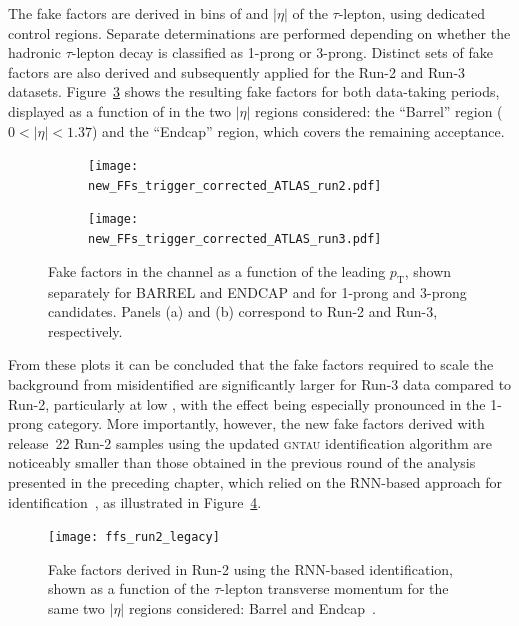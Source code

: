 The fake factors are derived in bins of \pt and $|\eta|$ of the $\tau$-lepton, using dedicated \taulephad control regions. Separate determinations are performed depending on whether the hadronic $\tau$-lepton decay is classified as 1-prong or 3-prong. Distinct sets of fake factors are also derived and subsequently applied for the Run-2 and Run-3 datasets. Figure~\ref{fig:ff_run2_run3} shows the resulting fake factors for both data-taking periods, displayed as a function of \pt in the two $|\eta|$ regions considered: the ``Barrel'' region ($0<|\eta|<1.37$) and the ``Endcap'' region, which covers the remaining acceptance.
\begin{figure}[htbp]
    \centering
    \begin{subfigure}[b]{0.49\textwidth}
      \centering
      \texttt{[image: new\_FFs\_trigger\_corrected\_ATLAS\_run2.pdf]}
      \caption{}
      \label{fig:ff_run2}
    \end{subfigure}
    \hfill
    \begin{subfigure}[b]{0.49\textwidth}
      \centering
      \texttt{[image: new\_FFs\_trigger\_corrected\_ATLAS\_run3.pdf]}
      \caption{}
      \label{fig:ff_run3}
    \end{subfigure}
    \caption{
      Fake factors in the \tauhadhad channel as a function of the leading $p_{\mathrm{T}}$,
      shown separately for BARREL and ENDCAP and for 1-prong and 3-prong candidates.
      Panels (a) and (b) correspond to Run-2
      and Run-3, respectively.
    }
    \label{fig:ff_run2_run3}
  \end{figure}
From these plots it can be concluded that the fake factors required to scale the background from misidentified \tauhad are significantly larger for Run-3 data compared to Run-2, particularly at low \pt, with the effect being especially pronounced in the 1-prong category. More importantly, however, the new fake factors derived with release~22 Run-2 samples using the updated \textsc{gntau} identification algorithm are noticeably smaller than those obtained in the previous round of the analysis presented in the preceding chapter, which relied on the RNN-based approach for \tauhad identification~\cite{serhat_tesis}, as illustrated in Figure~\ref{fig:ffs_run2_rnn}.  
  \begin{figure}[htbp]
    \centering
    \texttt{[image: ffs\_run2\_legacy]}
    \caption{Fake factors derived in Run-2 using the RNN-based \tauhad identification, 
    shown as a function of the $\tau$-lepton transverse momentum for the same two $|\eta|$ regions considered: Barrel and Endcap~\cite{serhat_tesis}.}
    \label{fig:ffs_run2_rnn}
  \end{figure}
